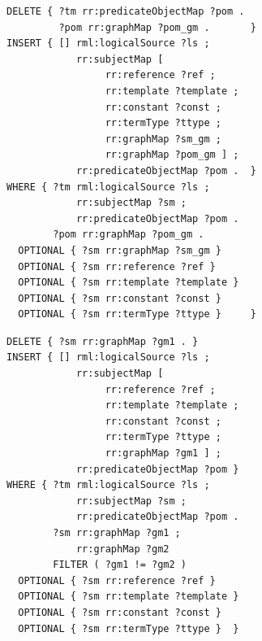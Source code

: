 \vspace{2mm}
\noindent
    \begin{minipage}[t]{0.55\textwidth}
{
\fontsize{6}{6.5}
\begin{verbatim}
DELETE { ?tm rr:predicateObjectMap ?pom .
         ?pom rr:graphMap ?pom_gm .       }
INSERT { [] rml:logicalSource ?ls ;
            rr:subjectMap [
                 rr:reference ?ref ;
                 rr:template ?template ;
                 rr:constant ?const ;
                 rr:termType ?ttype ;
                 rr:graphMap ?sm_gm ;
                 rr:graphMap ?pom_gm ] ; 
            rr:predicateObjectMap ?pom .  }
WHERE { ?tm rml:logicalSource ?ls ; 
            rr:subjectMap ?sm ; 
            rr:predicateObjectMap ?pom .
        ?pom rr:graphMap ?pom_gm .
  OPTIONAL { ?sm rr:graphMap ?sm_gm }
  OPTIONAL { ?sm rr:reference ?ref }
  OPTIONAL { ?sm rr:template ?template }
  OPTIONAL { ?sm rr:constant ?const }
  OPTIONAL { ?sm rr:termType ?ttype }     }
\end{verbatim}
}
\vspace{-2mm}
    \end{minipage}%
    \hfill%
    \begin{minipage}[t]{0.4\textwidth}
{
\fontsize{6}{6.5}
\begin{verbatim}
DELETE { ?sm rr:graphMap ?gm1 . }
INSERT { [] rml:logicalSource ?ls ;
            rr:subjectMap [
                 rr:reference ?ref ;
                 rr:template ?template ;
                 rr:constant ?const ;
                 rr:termType ?ttype ;
                 rr:graphMap ?gm1 ] ;
            rr:predicateObjectMap ?pom }
WHERE { ?tm rml:logicalSource ?ls ;
            rr:subjectMap ?sm ;
            rr:predicateObjectMap ?pom .
        ?sm rr:graphMap ?gm1 ;
            rr:graphMap ?gm2
        FILTER ( ?gm1 != ?gm2 )
  OPTIONAL { ?sm rr:reference ?ref }
  OPTIONAL { ?sm rr:template ?template }
  OPTIONAL { ?sm rr:constant ?const }
  OPTIONAL { ?sm rr:termType ?ttype }  }
\end{verbatim}
}
\vspace{-2mm}
    \end{minipage}

